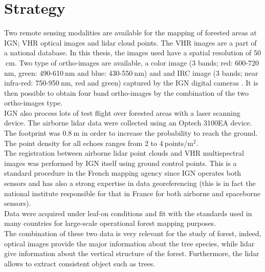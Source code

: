 \section{Strategy}
Two remote sensing modalities are available for the mapping of forested areas at IGN; VHR optical images and lidar cloud points. The VHR images are a part of a national database. In this thesis, the images used have a spatial resolution of 50$\:$cm. Two type of ortho-images are available, a color image (3 bands; red: 600-720$\:$nm, green: 490-610$\:$nm and blue: 430-550$\:$nm) and and IRC image (3 bands; near infra-red: 750-950$\:$nm, red and green) captured by the IGN digital cameras \citep{souchon2012large}. It is then possible to obtain four band ortho-images by the combination of the two ortho-images type. \\
IGN also process lots of test flight over forested areas with a laser scanning device. The airborne lidar data were collected using an Optech 3100EA device. The footprint was 0.8$\:$m in order to increase the probability to reach the ground. The point density {for all echoes} ranges from 2 to 4$\:$points/m$^{2}$. \\

The registration between airborne lidar point clouds and VHR multispectral images was performed by IGN itself using ground control points. This is a standard procedure in the French mapping agency since IGN operates both sensors and has also a strong expertise in data georeferencing (this is in fact the national institute responsible for that in France for both airborne and spaceborne sensors). \\
Data were acquired under leaf-on conditions and fit with the standards used in many countries for large-scale operational forest mapping purposes. \\

The combination of these two data is very relevant for the study of forest, indeed, optical images provide the major information about the tree species, while lidar give information about the vertical structure of the forest. Furthermore, the lidar allows to extract consistent object such as trees. \\

